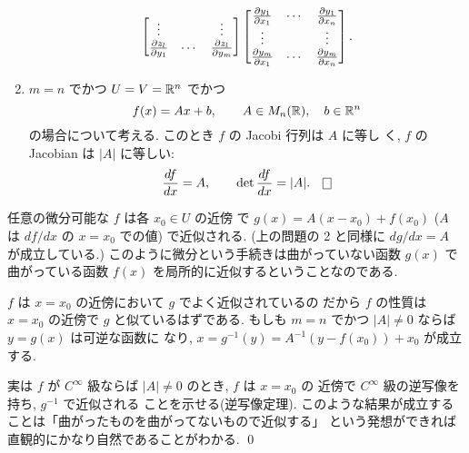 \documentclass[12pt,twoside]{jarticle}
\begin{document}
\begin{question}[Jacobian]
\begin{enumerate}
\begin{equation*}
\begin{bmatrix}
        \vdots            &        & \vdots \\
        \frac{\partial z_l}{\partial y_1} & \cdots & \frac{\partial z_l}{\partial y_m} \\
      \end{bmatrix}
      \begin{bmatrix}
        \frac{\partial y_1}{\partial x_1} & \cdots & \frac{\partial y_1}{\partial x_n} \\
        \vdots            &        & \vdots \\
        \frac{\partial y_m}{\partial x_1} & \cdots & \frac{\partial y_m}{\partial x_n} \\
      \end{bmatrix}.
    \end{equation*}
  \item $m=n$ でかつ $U=V={\mathbb R}^n$ でかつ
    \begin{equation*}
      f(x) = Ax + b, \qquad A \in M_n({\mathbb R}),\quad b\in {\mathbb R}^n
    \end{equation*}
    の場合について考える. このとき $f$ の Jacobi 行列は $A$ に等し
    く, $f$ の Jacobian は $|A|$ に等しい:
    \begin{equation*}
      \odfrac{f}{x} = A, \qquad \det\odfrac{f}{x} = |A|.
      \qed
    \end{equation*}
  \end{enumerate}
\end{question}

\begin{guide}[逆写像定理]
  任意の微分可能な $f$ は各 $x_0\in U$ の近傍
  で $g(x)=A(x-x_0)+f(x_0)$ ($A$ は $df/dx$ の $x=x_0$ での値) 
  で近似される.  (上の問題の 2 と同様に $dg/dx=A$ が成立している.)
  このように微分という手続きは曲がっていない函数 $g(x)$ で
  曲がっている函数 $f(x)$ を局所的に近似するということなのである.

  $f$ は $x=x_0$ の近傍において $g$ でよく近似されているの
  だから $f$ の性質は $x=x_0$ の近傍で $g$ と似ているはずである.
  もしも $m=n$ でかつ $|A|\ne 0$ ならば $y=g(x)$ は可逆な函数に
  なり, $x = g^{-1}(y) = A^{-1}(y-f(x_0)) + x_0$ が成立する.

  実は $f$ が $C^\infty$ 級ならば $|A|\ne 0$ のとき, $f$ は $x=x_0$ の
  近傍で $C^\infty$ 級の逆写像を持ち, $g^{-1}$ で近似される
  ことを示せる(逆写像定理).
  このような結果が成立することは「曲がったものを曲がってないもので近似する」
  という発想ができれば直観的にかなり自然であることがわかる.
  \qed
\end{guide}

\end{document}
